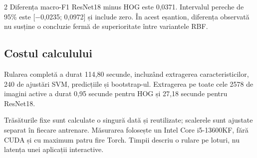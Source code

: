 \documentclass[10pt,a4paper]{article}
\begin{document}
\begin{multicols}{2}
Diferența macro-F1 ResNet18 minus HOG este 0,0371. Intervalul pereche de
95\% este [−0,0235; 0,0972] și include zero. În acest eșantion, diferența
observată nu susține o concluzie fermă de superioritate între variantele RBF.

\subsection{Costul calculului}
Rularea completă a durat 114,80 secunde, incluzând extragerea
caracteristicilor, 240 de ajustări SVM, predicțiile și bootstrap-ul.
Extragerea pe toate cele 2578 de imagini active a durat 0,95 secunde
pentru HOG și 27,18 secunde pentru ResNet18.

Trăsăturile fixe sunt calculate o singură dată și reutilizate; scalerele
sunt ajustate separat în fiecare antrenare. Măsurarea folosește un
Intel Core i5-13600KF, fără CUDA și cu maximum patru fire Torch. Timpii
descriu o rulare pe loturi, nu latența unei aplicații interactive.
\end{multicols}

\newpage
\end{document}
